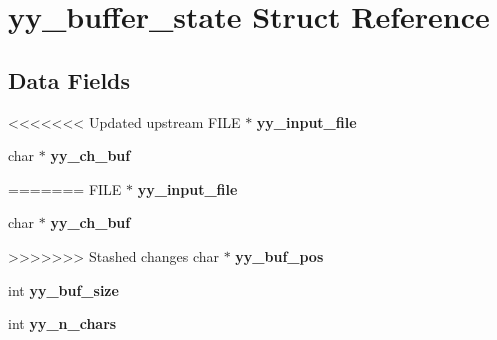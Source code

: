 \hypertarget{structyy__buffer__state}{}\section{yy\+\_\+buffer\+\_\+state Struct Reference}
\label{structyy__buffer__state}
\subsection*{Data Fields}
\begin{DoxyCompactItemize}
\item 
<<<<<<< Updated upstream
\mbox{\label{structyy__buffer__state_afb2a40bf9a1b84be81d8e8c0bbcbee21}} 
F\+I\+LE $\ast$ {\bfseries yy\+\_\+input\+\_\+file}
\item 
\mbox{\label{structyy__buffer__state_af61a9e79f8fc1edb3ae8a2fa2952ce22}} 
char $\ast$ {\bfseries yy\+\_\+ch\+\_\+buf}
\item 
\mbox{\label{structyy__buffer__state_ae8850ab3d90f9339c392020e7d83c4c7}} 
=======
\mbox{\label{structyy__buffer__state_aae49f75f50cbf473db7ba7a6134b9a6a}} 
F\+I\+LE $\ast$ {\bfseries yy\+\_\+input\+\_\+file}
\item 
\mbox{\label{structyy__buffer__state_ab8c1fb056870dfcc59768bca4e988cdd}} 
char $\ast$ {\bfseries yy\+\_\+ch\+\_\+buf}
\item 
\mbox{\label{structyy__buffer__state_afd1af9e284d7c432400835e417d85ee8}} 
>>>>>>> Stashed changes
char $\ast$ {\bfseries yy\+\_\+buf\+\_\+pos}
\item 
\mbox{\label{structyy__buffer__state_ae404f23e6786820b0213464ffcf9fd03}} 
int {\bfseries yy\+\_\+buf\+\_\+size}
\item 
\mbox{\label{structyy__buffer__state_aa86c122f2050dbfd365fcf547e6fc1c3}} 
int {\bfseries yy\+\_\+n\+\_\+chars}
\item 
\mbox{\label{structyy__buffer__state_a1e64bbdc1343d886bee3af97e19644bc}} 

\end{DoxyCompactItemize}
